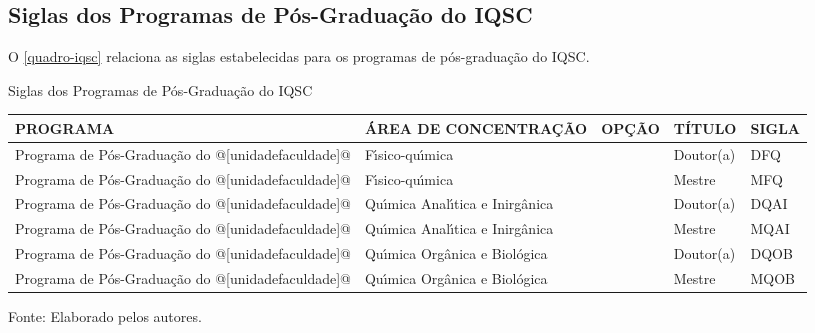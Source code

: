 \begin{apendicesenv}
\chapter{Siglas dos Programas de P\'os-Gradua\c{c}\~ao do IQSC}
O \autoref{quadro-iqsc} relaciona as siglas estabelecidas para os programas de p\'os-gradua\c{c}\~ao do IQSC.
\begin{quadro}[htb]
\ABNTEXfontereduzida
\caption[Siglas dos Programas de P\'os-Gradua\c{c}\~ao do IQSC]{Siglas dos Programas de P\'os-Gradua\c{c}\~ao do IQSC}
\label{quadro-iqsc}
\begin{tabular}{|p{3.5cm}|p{3.5cm}|p{3.5cm}|p{1.5cm}|p{2.25cm}|}
  \hline
   \textbf{PROGRAMA} & \textbf{\'AREA DE CONCENTRA\c{C}\~AO} & \textbf{OP\c{C}\~AO} & \textbf{T\'ITULO} & \textbf{SIGLA}  \\
    \hline
Programa de P\'os-Gradua\c{c}\~ao do @[unidadefaculdade]@& F\'{\i}sico-qu\'{\i}mica &  & Doutor(a) & DFQ\\
Programa de P\'os-Gradua\c{c}\~ao do @[unidadefaculdade]@& F\'{\i}sico-qu\'{\i}mica &  & Mestre & MFQ\\
Programa de P\'os-Gradua\c{c}\~ao do @[unidadefaculdade]@& Qu\'{\i}mica Anal\'{\i}tica e Inirg\^anica &  & Doutor(a) & DQAI\\
Programa de P\'os-Gradua\c{c}\~ao do @[unidadefaculdade]@& Qu\'{\i}mica Anal\'{\i}tica e Inirg\^anica &  & Mestre & MQAI\\
Programa de P\'os-Gradua\c{c}\~ao do @[unidadefaculdade]@& Qu\'{\i}mica Org\^anica e Biol\'ogica &  & Doutor(a) & DQOB\\
Programa de P\'os-Gradua\c{c}\~ao do @[unidadefaculdade]@& Qu\'{\i}mica Org\^anica e Biol\'ogica &  & Mestre & MQOB\\
\hline

\end{tabular}
\begin{flushleft}
		Fonte: Elaborado pelos autores.\
\end{flushleft}
\end{quadro}


\end{apendicesenv}
